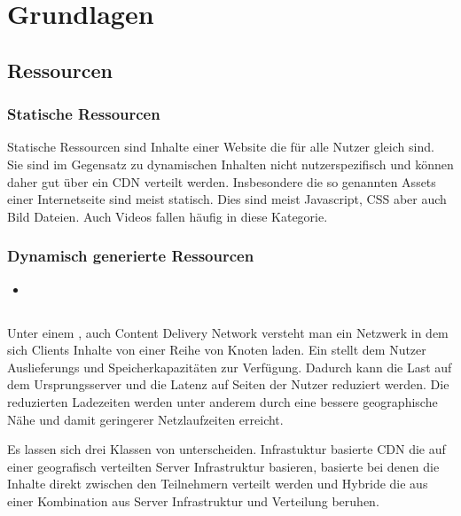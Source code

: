 \chapter{Grundlagen}\label{ch:related_work}

\section{Ressourcen}
\subsection{Statische Ressourcen}
Statische Ressourcen sind Inhalte einer Website die für alle Nutzer gleich sind. Sie sind im Gegensatz zu dynamischen Inhalten nicht nutzerspezifisch und können daher gut über ein CDN verteilt werden. Insbesondere die so genannten Assets einer Internetseite sind meist statisch. Dies sind meist Javascript, CSS aber auch Bild Dateien. Auch Videos fallen häufig in diese Kategorie.

\subsection{Dynamisch generierte Ressourcen}
\begin{itemize}
	\item 
\end{itemize}

\section{\cdn}
Unter einem \cdn, auch Content Delivery Network versteht man ein Netzwerk in dem sich Clients Inhalte von einer Reihe von Knoten laden. Ein \cdn stellt dem Nutzer Auslieferungs und Speicherkapazitäten zur Verfügung. Dadurch kann die Last auf dem Ursprungsserver und die Latenz auf Seiten der Nutzer reduziert werden. Die reduzierten Ladezeiten werden unter anderem durch eine bessere geographische Nähe und damit geringerer Netzlaufzeiten erreicht. %

Es lassen sich drei Klassen von \cdns unterscheiden. Infrastuktur basierte CDN die auf einer geografisch verteilten Server Infrastruktur basieren, \pTp basierte \cdns bei denen die Inhalte direkt zwischen den Teilnehmern verteilt werden und Hybride \cdns die aus einer Kombination aus Server Infrastruktur und \pTp Verteilung beruhen.

